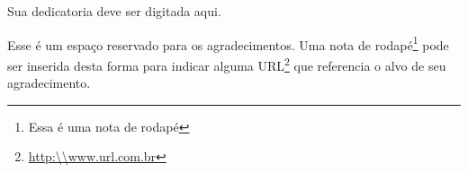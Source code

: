 \documentclass[
  12pt,		%
  a4paper,	%
  openright,%
  oneside,	%
  chapter=TITLE,		%
  section=TITLE,		%
  english,	%
  french,	%
  spanish,	%
  brazil	%
]{abntex2}
\begin{document}
    
    \begin{dedicatoria}
        \vspace*{\fill}
        \begin{flushright}
            Sua dedicatoria deve ser digitada aqui.
        \end{flushright}
        \vspace*{1cm}
    \end{dedicatoria}

    \begin{agradecimentos}
    
        Esse é um espaço reservado para os agradecimentos. Uma nota de rodapé\footnote{Essa é uma nota de rodapé} pode ser inserida desta forma para indicar alguma URL\footnote{\url{http:\\www.url.com.br}} que referencia o alvo de seu agradecimento.
    
    \end{agradecimentos}
    
    
\end{document}
